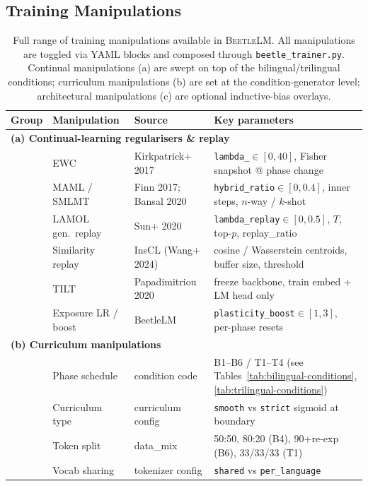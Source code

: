 \subsection{Training Manipulations}

\begin{table}[t]
\centering
\small
\caption{Full range of training manipulations available in \textsc{BeetleLM}.
All manipulations are toggled via YAML blocks and composed through
\texttt{beetle\_trainer.py}. Continual manipulations (a) are swept on top of
the bilingual/trilingual conditions; curriculum manipulations (b) are set at
the condition-generator level; architectural manipulations (c) are optional
inductive-bias overlays.}
\label{tab:beetle-manipulations}
\begin{tabular}{@{}l l l l@{}}
\toprule
Group & Manipulation & Source & Key parameters \\
\midrule
\multicolumn{4}{l}{\textbf{(a) Continual-learning regularisers \& replay}} \\
& EWC                & Kirkpatrick+ 2017       & \texttt{lambda\_}$\in[0,40]$, Fisher snapshot @ phase change \\
& MAML / SMLMT       & Finn 2017; Bansal 2020  & \texttt{hybrid\_ratio}$\in[0,0.4]$, inner steps, $n$-way / $k$-shot \\
& LAMOL gen.\ replay & Sun+ 2020               & \texttt{lambda\_replay}$\in[0,0.5]$, $T$, top-$p$, replay\_ratio \\
& Similarity replay  & InsCL (Wang+ 2024)      & cosine / Wasserstein centroids, buffer size, threshold \\
& TILT               & Papadimitriou 2020      & freeze backbone, train embed + LM head only \\
& Exposure LR / boost& BeetleLM                & \texttt{plasticity\_boost}$\in[1,3]$, per-phase resets \\
\midrule
\multicolumn{4}{l}{\textbf{(b) Curriculum manipulations}} \\
& Phase schedule     & condition code          & B1--B6 / T1--T4 (see Tables~\ref{tab:bilingual-conditions}, \ref{tab:trilingual-conditions}) \\
& Curriculum type    & curriculum config       & \texttt{smooth} vs \texttt{strict} sigmoid at boundary \\
& Token split        & data\_mix               & 50:50, 80:20 (B4), 90+re-exp (B6), 33/33/33 (T1) \\
& Vocab sharing      & tokenizer config        & \texttt{shared} vs \texttt{per\_language} \\

\end{tabular}
\end{table}
